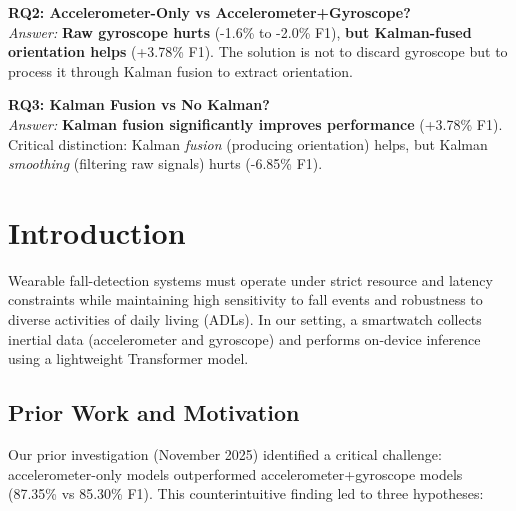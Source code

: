 \documentclass{article}
\begin{document}
\begin{tcolorbox}[colback=green!5,colframe=green!75!black]
\textbf{RQ2: Accelerometer-Only vs Accelerometer+Gyroscope?}\\
\textit{Answer:} \textbf{Raw gyroscope hurts} (-1.6\% to -2.0\% F1), \textbf{but Kalman-fused orientation helps} (+3.78\% F1). The solution is not to discard gyroscope but to process it through Kalman fusion to extract orientation.
\end{tcolorbox}

\begin{tcolorbox}[colback=orange!5,colframe=orange!75!black]
\textbf{RQ3: Kalman Fusion vs No Kalman?}\\
\textit{Answer:} \textbf{Kalman fusion significantly improves performance} (+3.78\% F1). Critical distinction: Kalman \textit{fusion} (producing orientation) helps, but Kalman \textit{smoothing} (filtering raw signals) hurts (-6.85\% F1).
\end{tcolorbox}

\newpage

\tableofcontents
\newpage

\section{Introduction}

Wearable fall-detection systems must operate under strict resource and latency constraints while maintaining high sensitivity to fall events and robustness to diverse activities of daily living (ADLs). In our setting, a smartwatch collects inertial data (accelerometer and gyroscope) and performs on-device inference using a lightweight Transformer model.

\subsection{Prior Work and Motivation}

Our prior investigation (November 2025) identified a critical challenge: accelerometer-only models outperformed accelerometer+gyroscope models (87.35\% vs 85.30\% F1). This counterintuitive finding led to three hypotheses:
\end{document}
